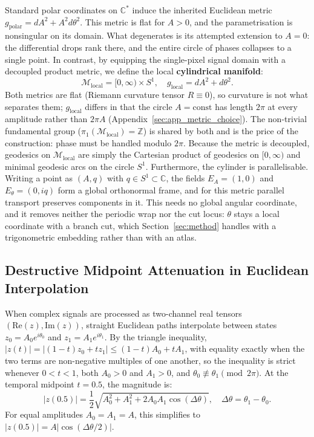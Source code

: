 Standard polar coordinates on $\mathbb{C}^*$ induce the inherited Euclidean metric $g_{\mathrm{polar}} = dA^2 + A^2 d\theta^2$. This metric is flat for $A > 0$, and the parametrisation is nonsingular on its domain. What degenerates is its attempted extension to $A = 0$: the differential drops rank there, and the entire circle of phases collapses to a single point. In contrast, by equipping the single-pixel signal domain with a decoupled product metric, we define the local \textbf{cylindrical manifold}:
\begin{equation}
    \mathcal{M}_{\text{local}} = [0, \infty) \times S^1, \quad g_{\text{local}} = dA^2 + d\theta^2.
\end{equation}
Both metrics are flat (Riemann curvature tensor $R \equiv 0$), so curvature is not what separates them; $g_{\text{local}}$ differs in that the circle $A = \mathrm{const}$ has length $2\pi$ at every amplitude rather than $2\pi A$ (Appendix~\ref{sec:app_metric_choice}). The non-trivial fundamental group ($\pi_1(\mathcal{M}_{\text{local}}) = \mathbb{Z}$) is shared by both and is the price of the construction: phase must be handled modulo $2\pi$. Because the metric is decoupled, geodesics on $\mathcal{M}_{\text{local}}$ are simply the Cartesian product of geodesics on $[0, \infty)$ and minimal geodesic arcs on the circle $S^1$. Furthermore, the cylinder is parallelisable. Writing a point as $(A, q)$ with $q \in S^1 \subset \mathbb{C}$, the fields $E_A = (1, 0)$ and $E_\theta = (0, i q)$ form a global orthonormal frame, and for this metric parallel transport preserves components in it. This needs no global angular coordinate, and it removes neither the periodic wrap nor the cut locus: $\theta$ stays a local coordinate with a branch cut, which Section~\ref{sec:method} handles with a trigonometric embedding rather than with an atlas.

\subsection{Destructive Midpoint Attenuation in Euclidean Interpolation}
\label{sec:midpoint_attenuation}
When complex signals are processed as two-channel real tensors $(\mathrm{Re}(z), \mathrm{Im}(z))$, straight Euclidean paths interpolate between states $z_0 = A_0 e^{i\theta_0}$ and $z_1 = A_1 e^{i\theta_1}$. By the triangle inequality, $|z(t)| = |(1-t)z_0 + t z_1| \le (1-t) A_0 + t A_1$, with equality exactly when the two terms are non-negative multiples of one another, so the inequality is strict whenever $0 < t < 1$, both $A_0 > 0$ and $A_1 > 0$, and $\theta_0 \not\equiv \theta_1 \pmod{2\pi}$. At the temporal midpoint $t = 0.5$, the magnitude is:
\begin{equation}
    |z(0.5)| = \frac{1}{2} \sqrt{A_0^2 + A_1^2 + 2 A_0 A_1 \cos(\Delta\theta)}, \quad \Delta\theta = \theta_1 - \theta_0.
\end{equation}
For equal amplitudes $A_0 = A_1 = A$, this simplifies to $|z(0.5)| = A |\cos(\Delta\theta / 2)|$.

